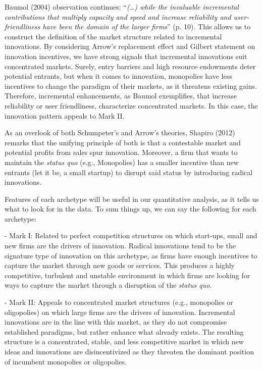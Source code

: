 \documentclass[12pt,a4paper]{article}
\begin{document}
Baumol (2004) observation continues: “\textit{(…) while the invaluable incremental contributions that multiply capacity and speed and increase reliability and user-friendliness have been the domain of the larger firms}” (p. 10). This allows us to construct the definition of the market structure related to incremental innovations. By considering Arrow’s replacement effect and Gilbert statement on innovation incentives, we have strong signals that incremental innovations suit concentrated markets. Surely, entry barriers and high resource endowments deter potential entrants, but when it comes to innovation, monopolies have less incentives to change the paradigm of their markets, as it threatens existing gains. Therefore, incremental enhancements, as Baumol exemplifies, that increase reliability or user friendliness, characterize concentrated markets. In this case, the innovation pattern appeals to Mark II.  

As an overlook of both Schumpeter’s and Arrow’s theories, Shapiro (2012) remarks that the unifying principle of both is that a contestable market and potential profits from sales spur innovation. Moreover, a firm that wants to maintain the \textit{status quo} (e.g., Monopolies) has a smaller incentive than new entrants (let it be, a small startup) to disrupt said status by introducing radical innovations. 

Features of each archetype will be useful in our quantitative analysis, as it tells us what to look for in the data. To sum things up, we can say the following for each archetype: 

- Mark I: Related to perfect competition structures on which start-ups, small and new firms are the drivers of innovation. Radical innovations tend to be the signature type of innovation on this archetype, as firms have enough incentives to capture the market through new goods or services. This produces a highly competitive, turbulent and unstable environment in which firms are looking for ways to capture the market through a disruption of the \textit{status quo}.  

- Mark II: Appeals to concentrated market structures (e.g., monopolies or oligopolies) on which large firms are the drivers of innovation. Incremental innovations are in the line with this market, as they do not compromise established paradigms, but rather enhance what already exists. The resulting structure is a concentrated, stable, and less competitive market in which new ideas and innovations are disincentivized as they threaten the dominant position of incumbent monopolies or oligopolies. 
\end{document}
